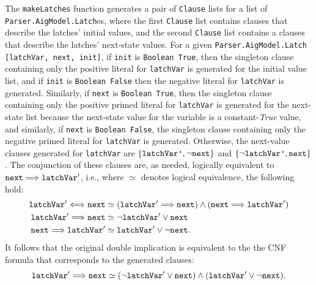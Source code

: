 \documentclass[12pt,a4paper,twoside,openright]{report}
\begin{document}
{The \verb,makeLatches, function generates a pair of \verb,Clause, lists
for a list of \verb,Parser.AigModel.Latch,es, where the first \verb,Clause, list contains
clauses that describe the latches' initial values, and the second \verb,Clause, list
contains a clauses that describe the latches' next-state values. For a given
\verb,Parser.AigModel.Latch, \verb.[latchVar, next, init]., if \verb,init, is \verb,Boolean True,,
then the singleton clause containing only the positive literal for \verb,latchVar, is generated for
the initial value list, and if \verb,init, is \verb,Boolean False, then the negative literal for \verb,latchVar,
is generated.
Similarly, if \verb,next, is \verb,Boolean True,, then the singleton clause containing only the positive primed
literal for \verb,latchVar, is generated for the next-state list because the next-state value for the variable
is a constant-{\it True} value, and similarly, if \verb,next, is \verb,Boolean False,,
the singleton clause containing only the negative primed literal for \verb,latchVar, is generated.
Otherwise, the next-value clauses generated for \verb,latchVar, are $\{\verb,latchVar',, \neg \verb,next,\}$
and $\{\neg\verb,latchVar',, \verb,next,\}$. The conjunction of these clauses are, as needed, logically equivalent
to ${\tt next} \Longrightarrow {\tt latchVar}'$, i.e., where $\simeq$ denotes logical equivalence,
the following hold:
\begin{align*}
{\tt latchVar}' \Longleftrightarrow {\tt next} &\simeq ({\tt latchVar}' \Longrightarrow {\tt next}) \wedge
({\tt next} \Longrightarrow {\tt latchVar}')\\
{\tt latchVar}' \Longrightarrow {\tt next} &\simeq \neg {\tt latchVar}' \vee {\tt next}\\
{\tt next} \Longrightarrow {\tt latchVar}' &\simeq {\tt latchVar}' \vee \neg {\tt next}.
\end{align*}
It follows that the original double implication is equivalent to the 
the CNF formula that corresponds to the generated clauses:
$${\tt latchVar}' \Longrightarrow {\tt next} \simeq
(\neg {\tt latchVar}' \vee {\tt next}) \wedge ({\tt latchVar}' \vee \neg {\tt next}).$$

}
\end{document}
